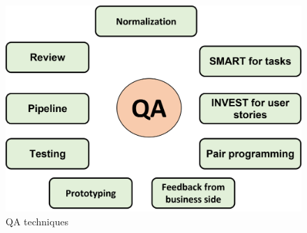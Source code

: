 \begin{figure}[h]
    \centering
    \includegraphics[scale=0.75]{resources/images/qa-techniques.png}
    \caption{QA techniques}
    \label{fig:qa-techniques}
\end{figure}